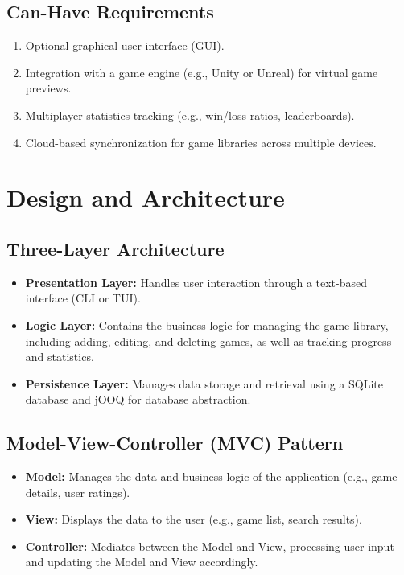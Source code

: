 \documentclass[paper=a4,fontsize=12pt,parskip=half*]{scrartcl}
\begin{document}
\subsection{Can-Have Requirements}
\begin{enumerate}
	\item Optional graphical user interface (GUI).
	\item Integration with a game engine (e.g., Unity or Unreal) for virtual game previews.
	\item Multiplayer statistics tracking (e.g., win/loss ratios, leaderboards).
	\item Cloud-based synchronization for game libraries across multiple devices.
\end{enumerate}

\section{Design and Architecture}

\subsection{Three-Layer Architecture}
\begin{itemize}
	\item \textbf{Presentation Layer:} Handles user interaction through a text-based interface (CLI or TUI).
	\item \textbf{Logic Layer:} Contains the business logic for managing the game library, including adding, editing, and deleting games, as well as tracking progress and statistics.
	\item \textbf{Persistence Layer:} Manages data storage and retrieval using a SQLite database and jOOQ for database abstraction.
\end{itemize}

\subsection{Model-View-Controller (MVC) Pattern}
\begin{itemize}
	\item \textbf{Model:} Manages the data and business logic of the application (e.g., game details, user ratings).
	\item \textbf{View:} Displays the data to the user (e.g., game list, search results).
	\item \textbf{Controller:} Mediates between the Model and View, processing user input and updating the Model and View accordingly.
\end{itemize}
\end{document}
